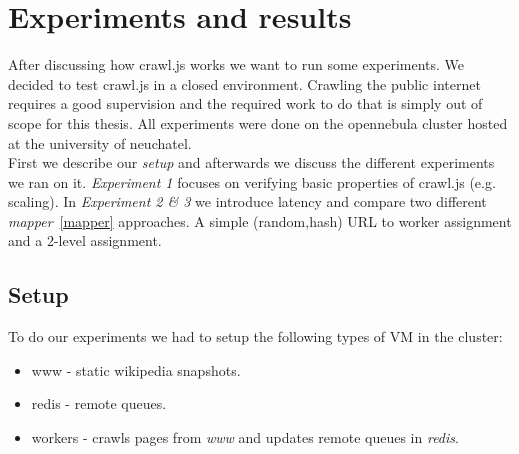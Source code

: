 
\chapter{Experiments and results} %

\label{Chapter5} %


After discussing how crawl.js works we want to run some experiments. We decided to test crawl.js in a closed environment. Crawling the public internet requires a good supervision and the required work to do that is simply out of scope for this thesis. All experiments were done on the opennebula cluster hosted at the university of neuchatel.
\\
First we describe our \emph{setup} and afterwards we discuss the different experiments we ran on it. \emph{Experiment 1} focuses on verifying basic properties of crawl.js (e.g. scaling). In \emph{Experiment 2 \& 3} we introduce latency and compare two different \emph{mapper}~\ref{mapper} approaches. A simple (random,hash) URL to worker assignment and a 2-level assignment.



\section{Setup}
To do our experiments we had to setup the following types of VM in the cluster:
\begin{itemize}
\item www - static wikipedia snapshots.
\item redis - remote queues.
\item workers - crawls pages from \emph{www} and updates remote queues in \emph{redis}.
\end{itemize}

